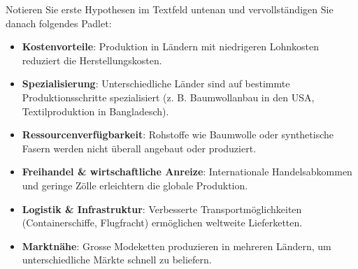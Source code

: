 \begin{myexercise}\label{ex:globaleLieferketten}

    Notieren Sie erste Hypothesen im Textfeld untenan und vervollständigen Sie danach folgendes Padlet:



    \begin{myanswer}
        \begin{itemize}
            \item \textbf{Kostenvorteile}: Produktion in Ländern mit niedrigeren Lohnkosten reduziert die Herstellungskosten.
            \item \textbf{Spezialisierung}: Unterschiedliche Länder sind auf bestimmte Produktionsschritte spezialisiert (z. B. Baumwollanbau in den USA, Textilproduktion in Bangladesch).
            \item \textbf{Ressourcenverfügbarkeit}: Rohstoffe wie Baumwolle oder synthetische Fasern werden nicht überall angebaut oder produziert.
            \item \textbf{Freihandel \& wirtschaftliche Anreize}: Internationale Handelsabkommen und geringe Zölle erleichtern die globale Produktion.
            \item \textbf{Logistik \& Infrastruktur}: Verbesserte Transportmöglichkeiten (Containerschiffe, Flugfracht) ermöglichen weltweite Lieferketten.
            \item \textbf{Marktnähe}: Grosse Modeketten produzieren in mehreren Ländern, um unterschiedliche Märkte schnell zu beliefern.
        \end{itemize}
    \end{myanswer}

\end{myexercise}

